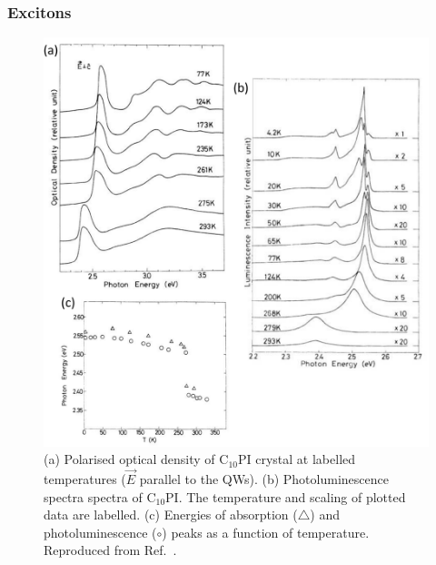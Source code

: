 \subsubsection{Excitons}
\begin{figure}[h!]
\centering
\includegraphics[width=\textwidth]{Fig13}
\caption{(a) Polarised optical density of $\textrm{C}_{10}$PI crystal at labelled temperatures ($\vec{E}$ parallel to the QWs). (b) Photoluminescence spectra spectra of $\textrm{C}_{10}$PI. The temperature and scaling of plotted data are labelled. (c) Energies of absorption ($\triangle$) and photoluminescence ($\circ$) peaks as a function of temperature. Reproduced from Ref.\ \cite{Ishihara1990}.}
\label{2Fig13}
\end{figure}
